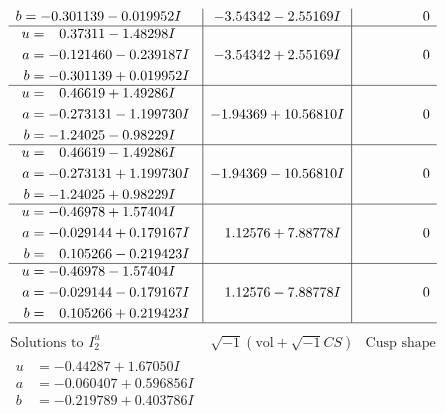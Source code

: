 \documentclass[1p]{elsarticle_modified}
\theoremstyle{definition}
\newcommand{\I}{\sqrt{-1}}
\begin{document}
$$\begin{array}{c|c|c}
\begin{aligned}
b &= -0.301139 - 0.019952 I\end{aligned}
 & -3.54342 - 2.55169 I & \phantom{-0.000000 } 0 \\ \hline\begin{aligned}
u &= \phantom{-}0.37311 - 1.48298 I \\
a &= -0.121460 - 0.239187 I \\
b &= -0.301139 + 0.019952 I\end{aligned}
 & -3.54342 + 2.55169 I & \phantom{-0.000000 } 0 \\ \hline\begin{aligned}
u &= \phantom{-}0.46619 + 1.49286 I \\
a &= -0.273131 - 1.199730 I \\
b &= -1.24025 - 0.98229 I\end{aligned}
 & -1.94369 + 10.56810 I & \phantom{-0.000000 } 0 \\ \hline\begin{aligned}
u &= \phantom{-}0.46619 - 1.49286 I \\
a &= -0.273131 + 1.199730 I \\
b &= -1.24025 + 0.98229 I\end{aligned}
 & -1.94369 - 10.56810 I & \phantom{-0.000000 } 0 \\ \hline\begin{aligned}
u &= -0.46978 + 1.57404 I \\
a &= -0.029144 + 0.179167 I \\
b &= \phantom{-}0.105266 - 0.219423 I\end{aligned}
 & \phantom{-}1.12576 + 7.88778 I & \phantom{-0.000000 } 0 \\ \hline\begin{aligned}
u &= -0.46978 - 1.57404 I \\
a &= -0.029144 - 0.179167 I \\
b &= \phantom{-}0.105266 + 0.219423 I\end{aligned}
 & \phantom{-}1.12576 - 7.88778 I & \phantom{-0.000000 } 0\\
 \hline 
 \end{array}$$\newpage$$\begin{array}{c|c|c}  
\text{Solutions to }I^u_{2}& \I (\text{vol} + \sqrt{-1}CS) & \text{Cusp shape}\\
 \hline 
\begin{aligned}
u &= -0.44287 + 1.67050 I \\
a &= -0.060407 + 0.596856 I \\
b &= -0.219789 + 0.403786 I\end{aligned}

\end{array}$$
\end{document}
